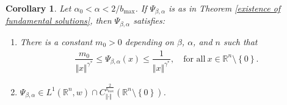 \documentclass[10pt, leqno]{article}
\newtheorem{corollary}[theorem]{Corollary}
\theoremstyle{definition}
\theoremstyle{remark}
\numberwithin{equation}{section}
\begin{document}
\begin{corollary}
\label{bounds and regularity of fund sol}
Let $ \alpha_{0} < \alpha < 2/b_{\max}$. If $\Psi_{\beta, \alpha}$ is as in Theorem \ref{existence of fundamental solutions}, then $\Psi_{\beta, \alpha}$ satisfies:
\begin{enumerate}
\item There is a constant $m_{0}>0$ depending on $\beta$, $\alpha$, and $n$ such that
\begin{eqnarray}
\label{bounds from below and from above}
\dfrac{m_{0}}{\Vert x \Vert^{\gamma^{\ast}}} \leq \Psi_{\beta, \alpha}(x) \leq \dfrac{1}{\Vert x \Vert^{\gamma^{\ast}}}, \quad \text{for all} \ x \in \mathbb{R}^{n} \setminus \left\lbrace 0 \right\rbrace.
\end{eqnarray}
\item $\Psi_{\beta, \alpha} \in L^{1}\left( \mathbb{R}^{n}, w \right) \cap C^{\frac{2}{b_{\max}}}_{\Vert \cdot \Vert}\left(\mathbb{R}^{n} \setminus \left\lbrace 0 \right\rbrace  \right)$.
\end{enumerate}
\end{corollary}
\end{document}
